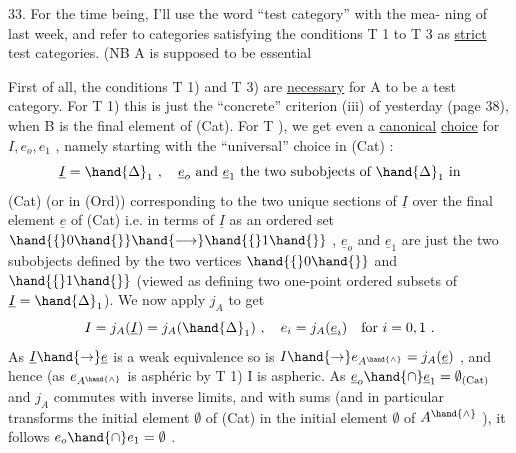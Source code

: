 33.   For the time being,  I'll use the word ``test category'' with the mea-%
ning of last week,  and refer to categories satisfying the conditions
T 1 to  T 3  as \uline{strict}  test categories. (NB A is supposed to be essential

First of all,  the conditions T 1) and T 3) are \uline{necessary} for A to be
a test category.  For  T 1)  this is just the ``concrete'' criterion (iii)
of yesterday (page 38),  when B is the final element of (Cat).  For T ),
we get even a \uline{canonical} \uline{choice} for $I,e_o,e_1$ ,  namely starting with the
 ``universal'' choice in (Cat) :
\[ \underline{I} = \hand{\Delta}_1 \ , \quad \underline{e}_o \text{ and } \underline{e}_1 \text{ the two subobjects of } \hand{\Delta}_1 \text{ in} \]
(Cat) (or in (Ord)) corresponding to the
two unique sections of $\underline{I}$ over the final
element $\underline{e}$ of (Cat)\hand{,}
i.e. in terms of $\underline{I}$ as an ordered set $\hand{\{}0\hand{\}} \hand{\longrightarrow} \hand{\{}1\hand{\}}$ ,  $\underline{e}_o$ and $\underline{e}_1$ are just the
two subobjects defined by the two vertices $\hand{\{}0\hand{\}}$ and $\hand{\{}1\hand{\}}$ (viewed as defining
two one-point ordered subsets of $\underline{I} = \hand{\Delta}_1$).  We now apply $j_A$ to get
\[ I = j_A(\underline{I}) = j_A(\hand{\Delta}_1) \ , \quad e_i = j_A(\underline{e}_i) \quad \text{for } i = 0,1 \ . \]
As  $\underline{I} \hand{\to} \underline{e}$  is a weak equivalence so is $I \hand{\to} e_{A^{\hand{\wedge}}} = j_A(\underline{e})$ ,  and hence (as $e_{A^{\hand{\wedge}}}$
is asphéric by T 1) I is aspheric.  As $\underline{e}_o \hand{\cap} \underline{e}_1 = \emptyset_{(\mathrm{Cat})}$  and $j_A$ commutes
with inverse limits,  and with sums (and in particular  transforms the
initial element  $\emptyset$ of (Cat) in the initial element $\emptyset$ of $A^{\hand{\wedge}}$ ), it follows
$e_o \hand{\cap} e_1 = \emptyset$ .

